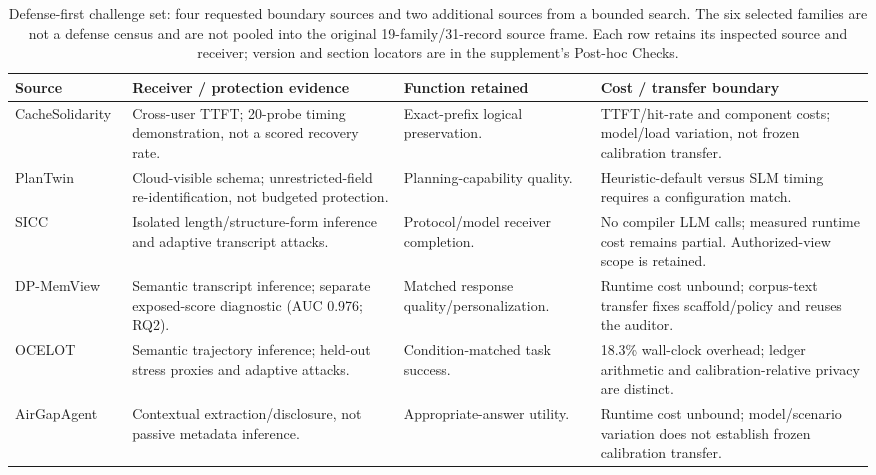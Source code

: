\begin{table}[t]\centering\footnotesize
\caption{Defense-first challenge set: four requested boundary sources and two additional sources from a bounded search. The six selected families are not a defense census and are not pooled into the original 19-family/31-record source frame. Each row retains its inspected source and receiver; version and section locators are in the supplement's Post-hoc Checks.}\label{tab:r42-defense-first}
\setlength{\tabcolsep}{3pt}
\begin{tabularx}{\textwidth}{@{}p{}p{}p{}Y@{}}\toprule
Source & Receiver / protection evidence & Function retained & Cost / transfer boundary\\\midrule
CacheSolidarity~\cite{pennas2026cachesolidarity} & Cross-user TTFT; 20-probe timing demonstration, not a scored recovery rate. & Exact-prefix logical preservation. & TTFT/hit-rate and component costs; model/load variation, not frozen calibration transfer.\\
PlanTwin~\cite{yu2026plantwin} & Cloud-visible schema; unrestricted-field re-identification, not budgeted protection. & Planning-capability quality. & Heuristic-default versus SLM timing requires a configuration match.\\
SICC~\cite{xu2026sicc} & Isolated length/structure-form inference and adaptive transcript attacks. & Protocol/model receiver completion. & No compiler LLM calls; measured runtime cost remains partial. Authorized-view scope is retained.\\
DP-MemView~\cite{dpmemview2026} & Semantic transcript inference; separate exposed-score diagnostic (AUC 0.976; RQ2). & Matched response quality/personalization. & Runtime cost unbound; corpus-text transfer fixes scaffold/policy and reuses the auditor.\\
OCELOT~\cite{xie2026ocelot} & Semantic trajectory inference; held-out stress proxies and adaptive attacks. & Condition-matched task success. & 18.3\% wall-clock overhead; ledger arithmetic and calibration-relative privacy are distinct.\\
AirGapAgent~\cite{bagdasarian2024airgap} & Contextual extraction/disclosure, not passive metadata inference. & Appropriate-answer utility. & Runtime cost unbound; model/scenario variation does not establish frozen calibration transfer.\\
\bottomrule\end{tabularx}
\par\smallskip\raggedright\footnotesize

\end{table}
